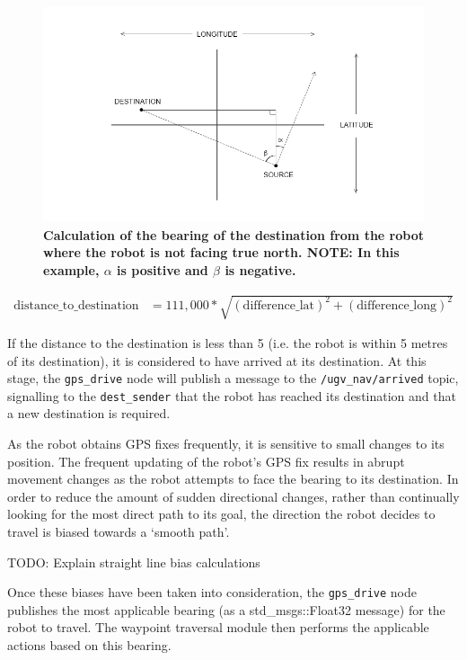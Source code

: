 \documentclass[titlepage,12pt,a4paper]{article}
\begin{document}
\begin{figure}[h]
	\centering
	\includegraphics[scale=0.6]{bearingsOffset.png}
	\caption{\textbf{Calculation of the bearing of the destination from the robot where the robot is not facing true north. NOTE: In this example, $\alpha$ is positive and $\beta$ is negative.}}
\end{figure}

\pagebreak


\begin{align*}
	\text{distance\_to\_destination}	&= 	111,000 * \sqrt{(\text{difference\_lat})^2 + (\text{difference\_long})^2}
\end{align*}

If the distance to the destination is less than 5 (i.e. the robot is within 5 metres of its destination), it is considered to have arrived at its destination. At this stage, the \verb|gps_drive| node will publish a message to the \verb|/ugv_nav/arrived| topic, signalling to the \verb|dest_sender| that the robot has reached its destination and that a new destination is required.




As the robot obtains GPS fixes frequently, it is sensitive to small changes to its position. The frequent updating of the robot's GPS fix results in abrupt movement changes as the robot attempts to face the bearing to its destination. In order to reduce the amount of sudden directional changes, rather than continually looking for the most direct path to its goal, the direction the robot decides to travel is biased towards a `smooth path'.


TODO: Explain straight line bias calculations 


Once these biases have been taken into consideration, the \verb|gps_drive| node publishes the most applicable bearing (as a std\_msgs::Float32 message) for the robot to travel. The waypoint traversal module then performs the applicable actions based on this bearing.
\end{document}
